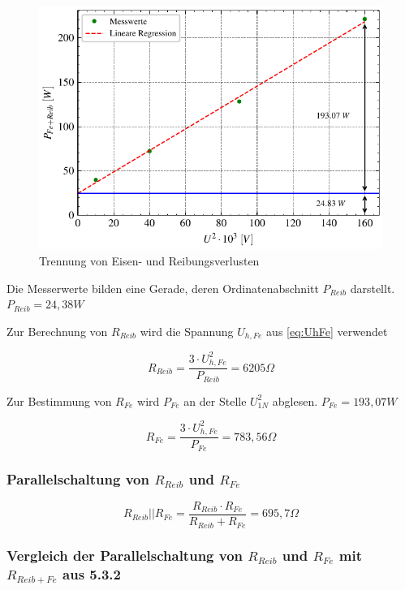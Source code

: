 \documentclass[conference]{IEEEtran}
\begin{document}
\begin{figure}[htbp]
    \centering
    \includegraphics[width=\columnwidth]{./figures/trennung_eisen_reib.pdf}
    \caption{Trennung von Eisen- und Reibungsverlusten}
    \label{fig:trennung_von_eisen_reib}
\end{figure}

Die Messerwerte bilden eine Gerade, deren Ordinatenabschnitt $P_{Reib}$
darstellt. $P_{Reib} = 24,38 \si{W}$

Zur Berechnung von $R_{Reib}$ wird die Spannung $U_{h, Fe}$ aus {\ref{eq:UhFe}}
verwendet

\begin{equation}
    R_{Reib} = \dfrac{3\cdot U_{h, Fe}^{2}}{ P_{Reib} } = 6205 \Omega
\end{equation}

Zur Bestimmung von $R_{Fe}$ wird $P_{Fe}$ an der Stelle $U_{1N}^{2}$ abglesen.
$P_{Fe} = 193,07 \si{W}$

\begin{equation}
    R_{Fe} = \dfrac{3\cdot U_{h,Fe}^{2}}{ P_{Fe} } = 783,56 \Omega
\end{equation}


\subsubsection{Parallelschaltung von $R_{Reib}$ und $R_{Fe}$ }

\begin{equation}
    R_{Reib}||R_{Fe} = \dfrac{ R_{Reib} \cdot R_{Fe}}{R_{Reib} + R_{Fe}} = 695,7 \Omega
\end{equation}


\subsubsection{Vergleich der Parallelschaltung von $R_{Reib}$ und $R_{Fe}$ mit $R_{Reib+Fe}$ aus 5.3.2}
\end{document}
